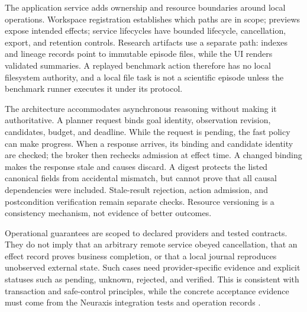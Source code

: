 The application service adds ownership and resource boundaries around local operations. Workspace registration establishes which paths are in scope; previews expose intended effects; service lifecycles have bounded lifecycle, cancellation, export, and retention controls. Research artifacts use a separate path: indexes and lineage records point to immutable episode files, while the UI renders validated summaries. A replayed benchmark action therefore has no local filesystem authority, and a local file task is not a scientific episode unless the benchmark runner executes it under its protocol.

The architecture accommodates asynchronous reasoning without making it authoritative. A planner request binds goal identity, observation revision, candidates, budget, and deadline. While the request is pending, the fast policy can make progress. When a response arrives, its binding and candidate identity are checked; the broker then rechecks admission at effect time. A changed binding makes the response stale and causes discard. A digest protects the listed canonical fields from accidental mismatch, but cannot prove that all causal dependencies were included. Stale-result rejection, action admission, and postcondition verification remain separate checks. Resource versioning is a consistency mechanism, not evidence of better outcomes.

Operational guarantees are scoped to declared providers and tested contracts. They do not imply that an arbitrary remote service obeyed cancellation, that an effect record proves business completion, or that a local journal reproduces unobserved external state. Such cases need provider-specific evidence and explicit statuses such as pending, unknown, rejected, and verified. This is consistent with transaction and safe-control principles, while the concrete acceptance evidence must come from the Neuraxis integration tests and operation records \cite{lamport1998,schulman2017,suttonbarto2018,amodei2016,leike2018}.

